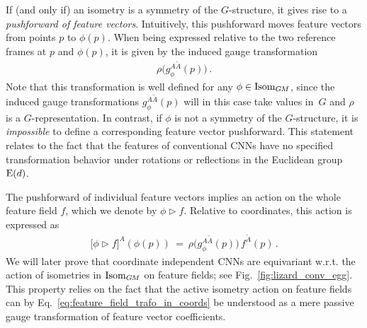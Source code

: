 If (and only if) an isometry is a symmetry of the $G$-structure, it gives rise to a \emph{pushforward of feature vectors}.
Intuitively, this pushforward moves feature vectors from points $p$ to $\phi(p)$.
When being expressed relative to the two reference frames at $p$ and $\phi(p)$, it is given by the induced gauge transformation
\begin{align}
    \rho\big( g_\phi^{A\widetilde{A}}(p) \big) \,.
\end{align}
Note that this transformation is well defined for any $\phi \in \operatorname{Isom}_{G\mkern-1.4muM}$, since the induced gauge transformations $g_\phi^{A\widetilde{A}}(p)$ will in this case take values in~$G$ and $\rho$ is a $G$-representation.
In contrast, if $\phi$ is not a symmetry of the $G$-structure, it is \emph{impossible} to define a corresponding feature vector pushforward.
This statement relates to the fact that the features of conventional CNNs have no specified transformation behavior under rotations or reflections in the Euclidean group~$\operatorname{E}(d)$.


The pushforward of individual feature vectors implies an action on the whole feature field $f$, which we denote by $\phi \rhd f$.
Relative to coordinates, this action is expressed as
\begin{align}\label{eq:feature_field_trafo_in_coords}
    \big[\phi \rhd f\big]^A(\phi(p)) \ =\ \rho\big( g_\phi^{A\widetilde{A}}(p)\big)\, f^{\widetilde{A}}(p) \,.
\end{align}
We will later prove that coordinate independent CNNs are equivariant w.r.t. the action of isometries in $\operatorname{Isom}_{G\mkern-1.4muM}$ on feature fields; see Fig.~\ref{fig:lizard_conv_egg}.
This property relies on the fact that the active isometry action on feature fields can by Eq.~\eqref{eq:feature_field_trafo_in_coords} be understood as a mere passive gauge transformation of feature vector coefficients.
